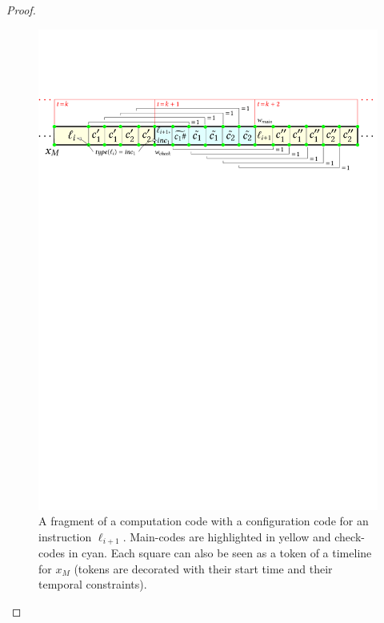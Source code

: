 \begin{proof}
\begin{figure}
    \centering
    \includegraphics[width=\textwidth]{Chaps/Timelines/counters.pdf}
    \caption{
%  
A fragment of a computation code with a configuration code for 
an instruction $\ell_{i+1}$. Main-codes are highlighted in yellow and check-codes in cyan. Each square can also be seen as a token of a timeline for $x_M$ (tokens are decorated with their start time and their temporal constraints).
}
\end{figure}
\end{proof}
